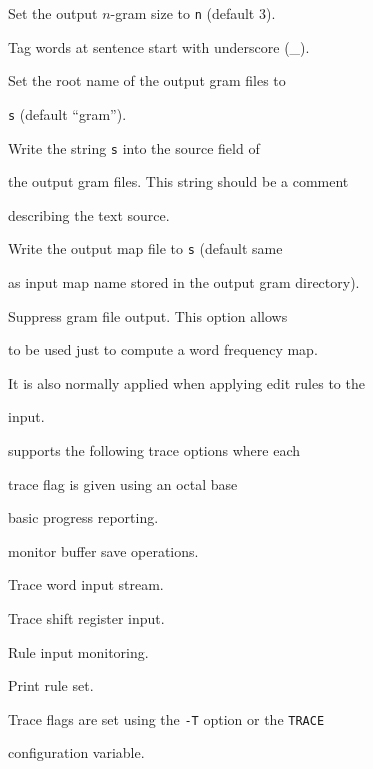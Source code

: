 \begin{optlist}
   Set the output $n$-gram size to \texttt{n} (default 3).





   Tag words at sentence start with underscore (\_).





   Set the root name of the output gram files to


       \texttt{s} (default ``gram'').





   Write the string \texttt{s} into the source field of


       the output gram files.  This string should be a comment


       describing the text source.





   Write the output map file to \texttt{s} (default same


      as input map name stored in the output gram directory).





   Suppress gram file output. This option allows


       to be used just to compute a word frequency map.


      It is also normally applied when applying edit rules to the


      input.





  \stdoptQ


\end{optlist}












 supports the following trace options where each


trace flag is given using an octal base


\begin{optlist}


  basic progress reporting. 


  monitor buffer save operations.


  Trace word input stream.


  Trace shift register input.


  Rule input monitoring.


  Print rule set.


\end{optlist}


Trace flags are set using the \texttt{-T} option or the \texttt{TRACE}


configuration variable.




